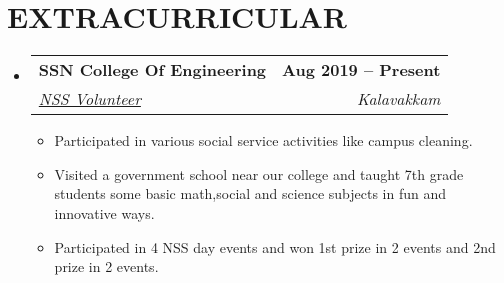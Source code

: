 \documentclass[letterpaper,11pt]{article}
\makeatletter
\newcommand{\resumeItem}[1]{
  \item\small{
    {#1 \vspace{-2pt}}
  }
}
\newcommand{\resumeSubheading}[4]{
  \vspace{-2pt}\item
    \begin{tabular*}{1.0\textwidth}[t]{l@{\extracolsep{\fill}}r}
      \textbf{\large#1} & \textbf{\small #2} \\
      \textit{\large#3} & \textit{\small #4} \\
      
    \end{tabular*}\vspace{-7pt}
}
\newcommand{\resumeSubHeadingListStart}{\begin{itemize}[leftmargin=0.0in, label={}]}
\newcommand{\resumeSubHeadingListEnd}{\end{itemize}}
\newcommand{\resumeItemListStart}{\begin{itemize}}
\newcommand{\resumeItemListEnd}{\end{itemize}\vspace{-5pt}}
\newcommand\sbullet[1][.5]{\mathbin{\vcenter{\hbox{\scalebox{#1}{$\bullet$}}}}}
\makeatother
\begin{document}
\section{EXTRACURRICULAR}
    \resumeSubHeadingListStart
        \resumeSubheading{SSN College Of Engineering}{Aug 2019 -- Present}{\underline{NSS Volunteer}}{Kalavakkam}
            \linebreak{}
            \resumeItemListStart
                \resumeItem{\normalsize{Participated in various social service activities like campus cleaning.}}
                \resumeItem{\normalsize{Visited a government school near our college and taught 7th grade students some basic math,social and science subjects in fun and innovative ways.}}
                \resumeItem{\normalsize{Participated in 4 NSS day events and won 1st prize in 2 events and 2nd prize in 2 events.}}
            \resumeItemListEnd
    \resumeSubHeadingListEnd
 \vspace{-11pt}
 



\end{document}
